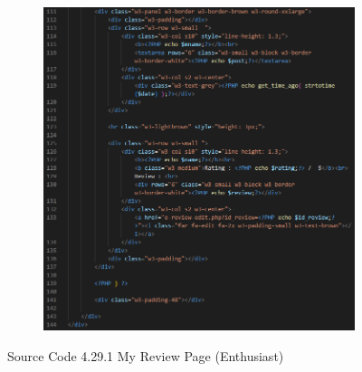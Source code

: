 \begin{enumerate}[1.]
\begin{figure}[h]
\begin{subfigure}[b]{0.7\textwidth}
            \label{fig:sub1}
        \end{subfigure}
        \hspace{0.04\textwidth}
        \begin{subfigure}[b]{0.7\textwidth}
            \centering
            \includegraphics[width=\textwidth]{mainmatter/images/frontend/code/emyreview2.png}
            \label{fig:sub2}
        \end{subfigure}
        \caption*{Source Code 4.29.1 My Review Page (Enthusiast)}
        \label{fig:myfig68a}
    \end{figure}
    \clearpage


\end{enumerate}
